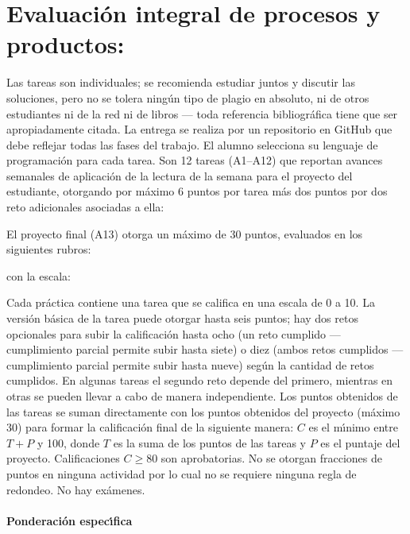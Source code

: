 \section{Evaluaci\'{o}n integral de procesos y productos:}

Las tareas son individuales; se recomienda estudiar juntos y
discutir las soluciones, pero no se tolera ning\'{u}n tipo de plagio
en absoluto, ni de otros estudiantes ni de la red ni de libros ---
toda referencia bibliogr\'{a}fica tiene que ser apropiadamente
citada. La entrega se realiza por un repositorio en GitHub que debe
reflejar todas las fases del trabajo. El
alumno selecciona su lenguaje de programaci\'{o}n para cada
tarea. Son 12 tareas (A1--A12) que reportan avances semanales de
aplicaci\'{o}n de la lectura de la semana para el proyecto del
estudiante, otorgando por m\'{a}ximo 6 puntos por tarea m\'{a}s dos
puntos por dos reto adicionales asociadas a ella:

El proyecto final (A13) otorga un m\'{a}ximo de 30 puntos, evaluados en los
siguientes rubros:

con la escala:


Cada pr\'{a}ctica contiene una tarea que se califica en una escala de
0 a 10. La versi\'{o}n b\'{a}sica de la tarea puede otorgar hasta seis
puntos; hay dos retos opcionales para subir la calificaci\'{o}n hasta
ocho (un reto cumplido --- cumplimiento parcial permite subir hasta
siete) o diez (ambos retos cumplidos --- cumplimiento parcial permite
subir hasta nueve) seg\'{u}n la cantidad de retos cumplidos. En
algunas tareas el segundo reto depende del primero, mientras en otras
se pueden llevar a cabo de manera independiente.  Los puntos obtenidos
de las tareas se suman directamente con los puntos obtenidos del
proyecto (m\'{a}ximo 30) para formar la calificaci\'{o}n final de la
siguiente manera: $C$ es el m\'{\i}nimo entre $T + P$ y 100, donde $T$
es la suma de los puntos de las tareas y $P$ es el puntaje del
proyecto.  Calificaciones $C \geq 80$ son aprobatorias. No se otorgan
fracciones de puntos en ninguna actividad por lo cual no se requiere
ninguna regla de redondeo. No hay ex\'{a}menes.

\paragraph{Ponderaci\'{o}n espec\'{\i}fica}

\quad

